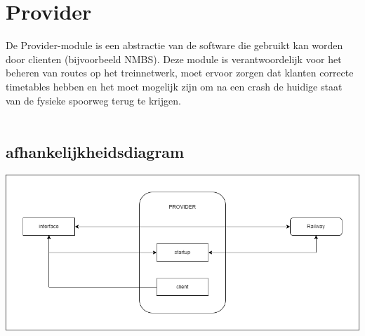 \documentclass[a4paper, 11pt]{article}
\newcommand{\<}{\scriptsize\textless\normalsize}
\renewcommand{\>}{\scriptsize\textgreater\normalsize}
\begin{document}
\newpage
\section{Provider} %
De Provider-module is een abstractie van de software die gebruikt kan worden door clienten (bijvoorbeeld NMBS). Deze module is verantwoordelijk voor het beheren van routes op het treinnetwerk, moet ervoor zorgen dat klanten correcte timetables hebben en het moet mogelijk zijn om na een crash de huidige staat van de fysieke spoorweg terug te krijgen.\\\\

\subsection{afhankelijkheidsdiagram} %
\begin{center}
	\includegraphics[scale=.5]{Afhankelijkheidsdiagrammen/provider.png}
\end{center}
\end{document}
